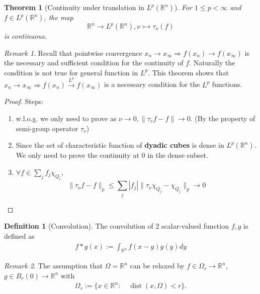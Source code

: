 \documentclass[a4paper,11pt,fleqn]{book}
\newtheorem{theorem}{Theorem}[section]
\theoremstyle{definition}
\newtheorem{definition}{Definition}[section]
\theoremstyle{remark}
\newtheorem*{remark}{Remark}
\DeclareMathOperator*{\dist}{dist}
\begin{document}
\begin{theorem}[Continuity under translation in $L^p(\mathbb{R}^n)$]
For $1 \leq p < \infty$ and $f \in L^p(\mathbb{R}^n)$, the map
\begin{equation*}
	\mathbb{R}^n \rightarrow L^p(\mathbb{R}^n), \nu \rightarrowtail \tau_\nu(f)
\end{equation*}
is continuous.
\end{theorem}
\begin{remark}
	Recall that pointwise convergence $x_n \rightarrow x_\infty \Rightarrow f(x_n) \rightarrow f(x_\infty)$ is the necessary and sufficient condition for the continuity of $f$. Naturally the condition is not true for general function in $L^p$. 
	This theorem shows that $x_n \rightarrow x_\infty \Rightarrow f(x_n) \overset{L^p}{\rightarrow} f(x_\infty)$ is a necessary condition for the $L^p$ functions.
\end{remark}
\begin{proof}
	Steps:
	\begin{enumerate}
		\item w.l.o.g. we only need to prove as $\nu \rightarrow 0, \|\tau_v f - f\| \rightarrow 0$. (By the property of semi-group operator $\tau_v$)
		\item Since the set of characteristic function of  \textbf{dyadic cubes} is dense in $L^p(\mathbb{R}^n)$. We only need to prove the continuity at 0 in the dense subset. 
		\item $\forall f \in \sum_j f_j \chi_{Q_j}$, 
			\begin{equation*}
				\|\tau_\nu f - f\|_p \leq \sum_j |f_j| \| \tau_\nu  \chi_{Q_j} - \chi_{Q_j}\|_p \rightarrow 0
			\end{equation*}
	\end{enumerate}
\end{proof}

\begin{definition}[Convolution]
	The convolution of 2 scalar-valued function $f, g$ is defined as 
	\begin{align*}
		f*g(x) := \int_{\mathbb{R}^n}f(x-y)g(y)dy
	\end{align*}
\end{definition}
\begin{remark}
The assumption that $\Omega = \mathbb{R}^n$ can be relaxed by $f \in \Omega_r \rightarrow \mathbb{R}^n$, $g \in B_r(0) \rightarrow \mathbb{R}^n$ with 
\begin{align*}
	\Omega_r:= \{ x \in \mathbb{R}^n:\quad \dist(x, \Omega) < r \}. 
\end{align*}	
\end{remark}
\end{document}
